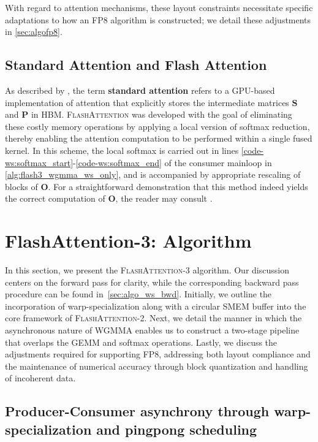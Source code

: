 With regard to attention mechanisms, these layout constraints necessitate specific adaptations to how an FP8 algorithm is constructed; we detail these adjustments in \cref{sec:algofp8}.

\subsection{Standard Attention and Flash Attention} As described by \citet{dao2022flashattention}, the term \textbf{standard attention} refers to a GPU-based implementation of attention that explicitly stores the intermediate matrices $\mathbf{S}$ and $\mathbf{P}$ in HBM. \textsc{FlashAttention} was developed with the goal of eliminating these costly memory operations by applying a local version of softmax reduction, thereby enabling the attention computation to be performed within a single fused kernel. In this scheme, the local softmax is carried out in lines \ref{code-ws:softmax_start}-\ref{code-ws:softmax_end} of the consumer mainloop in \cref{alg:flash3_wgmma_ws_only}, and is accompanied by appropriate rescaling of blocks of $\mathbf{O}$. For a straightforward demonstration that this method indeed yields the correct computation of $\mathbf{O}$, the reader may consult \cite[\S 2.3.1]{dao2023flashattention2}.

\section{FlashAttention-3: Algorithm}
\label{sec:algo}

In this section, we present the \textsc{FlashAttention-3} algorithm. Our discussion centers on the forward pass for clarity, while the corresponding backward pass procedure can be found in~\cref{sec:algo_ws_bwd}. Initially, we outline the incorporation of warp-specialization along with a circular SMEM buffer into the core framework of \textsc{FlashAttention-2}. Next, we detail the manner in which the asynchronous nature of WGMMA enables us to construct a two-stage pipeline that overlaps the GEMM and softmax operations. Lastly, we discuss the adjustments required for supporting FP8, addressing both layout compliance and the maintenance of numerical accuracy through block quantization and handling of incoherent data.

\subsection{Producer-Consumer asynchrony through warp-specialization and pingpong scheduling}
\label{sec:algo_ws}

